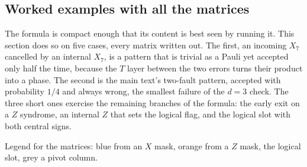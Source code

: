 \subsection{Worked examples with all the matrices}\label{app:B-examples}
The formula is compact enough that its content is best seen by running it. This section does so on five cases, every matrix written out. The first, an incoming $X_7$ cancelled by an internal $X_7$, is a pattern that is trivial as a Pauli yet accepted only half the time, because the $T$ layer between the two errors turns their product into a phase. The second is the main text's two-fault pattern, accepted with probability $1/4$ and always wrong, the smallest failure of the $d=3$ check. The three short ones exercise the remaining branches of the formula: the early exit on a $Z$ syndrome, an internal $Z$ that sets the logical flag, and the logical slot with both central signs.

Legend for the matrices: \colorbox{tnblue!22}{blue} from an $X$ mask, \colorbox{tnorange!22}{orange} from a $Z$ mask,  the logical slot, \colorbox{black!22}{grey} a pivot column.


